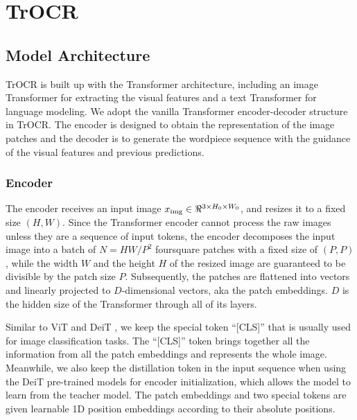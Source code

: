 \documentclass[letterpaper]{article} \usepackage{aaai23}  \usepackage{times}  \usepackage{helvet}  \usepackage{courier}  \usepackage[hyphens]{url}  \usepackage{graphicx} \urlstyle{rm} \def\UrlFont{\rm}  \usepackage{natbib}  \usepackage{caption} \frenchspacing  \setlength{\pdfpagewidth}{8.5in} \setlength{\pdfpageheight}{11in} \usepackage{algorithm}
\begin{document}
\section{TrOCR}


\subsection{Model Architecture}
TrOCR is built up with the Transformer architecture, including an image Transformer for extracting the visual features and a text Transformer for language modeling. We adopt the vanilla Transformer encoder-decoder structure in TrOCR. The encoder is designed to obtain the representation of the image patches and the decoder is to generate the wordpiece sequence with the guidance of the visual features and previous predictions. 

\subsubsection{Encoder}
The encoder receives an input image $x_{\rm img} \in\Re^{3\times H_0\times W_0}$, and resizes it to a fixed size $(H, W)$. Since the Transformer encoder cannot process the raw images unless they are a sequence of input tokens, the encoder decomposes the input image into a batch of $N=HW/P^2$ foursquare patches with a fixed size of $(P, P)$,
while the width $W$ and the height $H$ of the resized image are guaranteed to be divisible by the patch size $P$. Subsequently, the patches are flattened into vectors and linearly projected to $D$-dimensional vectors, aka the patch embeddings. $D$ is the hidden size of the Transformer through all of its layers.

Similar to ViT \cite{dosovitskiy2020vit} and DeiT \cite{touvron2020deit}, we keep the special token ``[CLS]'' that is usually used for image classification tasks. The ``[CLS]'' token brings together all the information from all the patch embeddings and represents the whole image. Meanwhile, we also keep the distillation token in the input sequence when using the DeiT pre-trained models for encoder initialization, which allows the model to learn from the teacher model. The patch embeddings and two special tokens are given learnable 1D position embeddings according to their absolute positions. 
\end{document}
